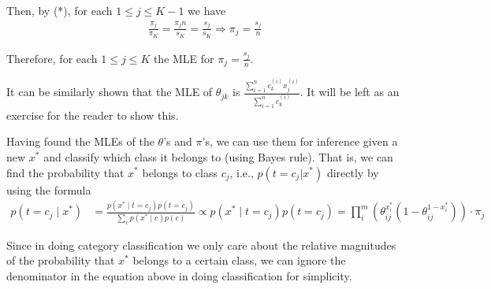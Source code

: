Then, by (*), for each $1 \leq j \leq K - 1$ we have
\begin{align*}
    \frac{\pi_j}{\pi_K} = \frac{\pi_j n}{s_K} = \frac{s_j}{s_K} \Longrightarrow \pi_j = \frac{s_j}{n}
\end{align*}

Therefore, for each $1 \leq j \leq K$ the MLE for $\pi_j = \frac{s_j}{n}$.

It can be similarly shown that the MLE of $\theta_{jk}$ is $\frac{\sum^{n}_{i = 1} c_k^{(i)} x^{(i)}_{j}}{\sum^{n}_{i = 1} c_k^{(i)}}$. It will be left as an exercise for the reader to show this.

Having found the MLEs of the $\theta$'s and $\pi$'s, we can use them for inference given a new $x^*$ and classify which class it belongs to (using Bayes rule). That is, we can find the probability that $x^*$ belongs to class $c_j$, i.e., $p(t = c_j | x^*)$ directly by using the formula
\begin{align*}
    p(t = c_j \mid x^*) &= \frac{p(x^* \mid t = c_j) p(t = c_j)}{\sum_{c} p(x^* \mid c) p(c)} \propto p(x^* \mid t = c_j) p(t = c_j) = \prod^{m}_{i}\left( \theta_{ij}^{x^*_i}(1 - \theta_{ij}^{1 - x^*_i}) \right) \cdot \pi_j
\end{align*}

Since in doing category classification we only care about the relative magnitudes of the probability that $x^*$ belongs to a certain class, we can ignore the denominator in the equation above in doing classification for simplicity.


